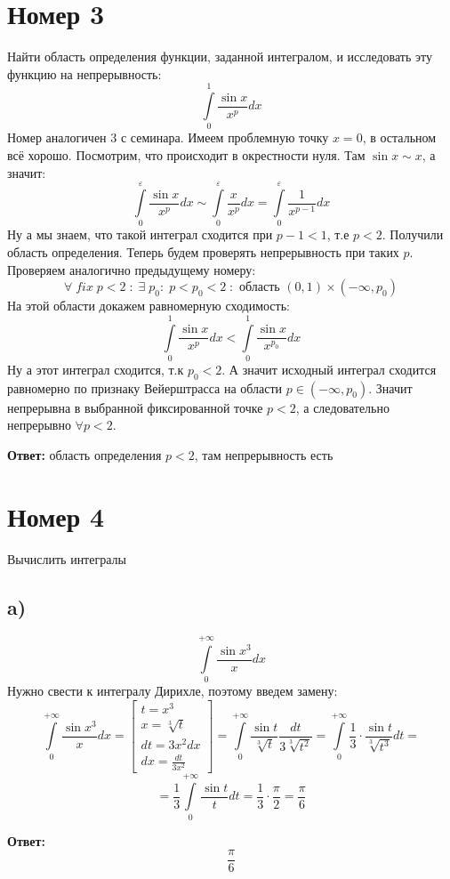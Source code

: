 \documentclass[a4paper,12pt]{article}
\begin{document}
\section*{Номер 3}
Найти область определения функции, заданной интегралом, и исследовать эту функцию на непрерывность:
\[
\int\limits_0^1 \frac{\sin x}{x^p} dx
\]
Номер аналогичен 3 с семинара. Имеем проблемную точку $x = 0$, в остальном всё хорошо. Посмотрим, что происходит в окрестности нуля. Там $\sin x \sim x$, а значит: 
\[
\int\limits_0^{\varepsilon}   \frac{\sin x}{x^p} dx \sim
\int\limits_0^{\varepsilon}   \frac{x}{x^p} dx  = 
\int\limits_0^{\varepsilon}   \frac{1}{x^{p - 1}} dx
\]
Ну а мы знаем, что такой интеграл сходится при $p - 1 < 1$, т.е $p < 2$. Получили область определения. Теперь будем проверять непрерывность при таких $p$. Проверяем аналогично предыдущему номеру:
\[
\forall \; fix \; p < 2 \; : \; \exists \; p_0 : \; p < p_0 < 2\; : \text{ область } (0, 1) \times (-\infty, p_0)
\]
На этой области докажем равномерную сходимость:
\[
\int\limits_0^1 \frac{\sin x}{x^p} dx 
< 
\int\limits_0^1 \frac{\sin x}{x^{p_0}} dx 
\]
Ну а этот интеграл сходится, т.к $p_0 < 2$. А значит исходный интеграл сходится равномерно по признаку Вейерштрасса на области $p \in (-\infty, p_0)$. Значит непрерывна в выбранной фиксированной точке $p < 2$, а следовательно непрерывно $\forall p < 2$.
\begin{center}
\textbf{Ответ: } область определения $p < 2$, там непрерывность есть
\end{center}
\clearpage
\section*{Номер 4}
Вычислить интегралы
\subsection*{a)}
\[
\int\limits_0^{+\infty} \frac{\sin x^3}{x} dx
\]
Нужно свести к интегралу Дирихле, поэтому введем замену:
\[
\int\limits_0^{+\infty} \frac{\sin x^3}{x} dx
=
\begin{bmatrix}
t = x^3 \\ 
x = \sqrt[3]{t} \\
dt = 3x^2 dx \\
dx = \frac{dt}{3x^2}
\end{bmatrix} =
\int\limits_0^{+\infty} \frac{\sin t}{\sqrt[3]{t}} \frac{dt}{3\sqrt[3]{t^2}} =
\int\limits_0^{+\infty} \frac{1}{3} \cdot \frac{\sin t}{\sqrt[3]{t^3}} dt =
\]
\[
=
\frac{1}{3}\int\limits_0^{+\infty}  \frac{\sin t}{t} dt 
=
\frac{1}{3} \cdot \frac{\pi}{2} = \frac{\pi}{6}
\]
\begin{center}
\textbf{Ответ: } 
\[
\frac{\pi}{6}
\]
\end{center}
\end{document}
